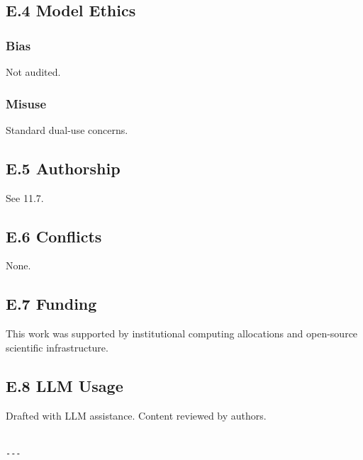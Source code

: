 \subsection{E.4 Model Ethics}

\subsubsection{Bias}
Not audited.

\subsubsection{Misuse}
Standard dual-use concerns.

\subsection{E.5 Authorship}

See  11.7.

\subsection{E.6 Conflicts}

None.

\subsection{E.7 Funding}

This work was supported by institutional computing allocations and open-source scientific infrastructure.

\subsection{E.8 LLM Usage}

Drafted with LLM assistance. Content reviewed by authors.
\begin{lstlisting}

---
\end{lstlisting}